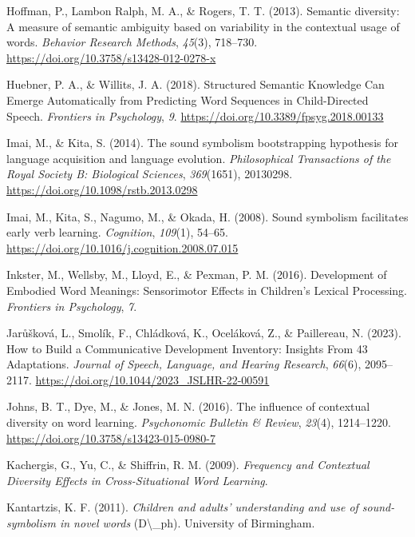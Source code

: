 \documentclass[
  man,floatsintext]{apa6}
\newlength{\cslhangindent}
\newenvironment{CSLReferences}[2] %
 {\begin{list}{}{%
  \setlength{\itemindent}{0pt}
  \setlength{\leftmargin}{0pt}
  \setlength{\parsep}{0pt}
  \ifodd #1
   \setlength{\leftmargin}{\cslhangindent}
   \setlength{\itemindent}{-1\cslhangindent}
  \fi
  \setlength{\itemsep}{#2\baselineskip}}}
 {\end{list}}
\begin{document}
\begin{CSLReferences}{1}{0}
Hoffman, P., Lambon Ralph, M. A., \& Rogers, T. T. (2013). Semantic diversity: {A} measure of semantic ambiguity based on variability in the contextual usage of words. \emph{Behavior Research Methods}, \emph{45}(3), 718--730. \url{https://doi.org/10.3758/s13428-012-0278-x}

Huebner, P. A., \& Willits, J. A. (2018). Structured {Semantic Knowledge Can Emerge Automatically} from {Predicting Word Sequences} in {Child-Directed Speech}. \emph{Frontiers in Psychology}, \emph{9}. \url{https://doi.org/10.3389/fpsyg.2018.00133}

Imai, M., \& Kita, S. (2014). The sound symbolism bootstrapping hypothesis for language acquisition and language evolution. \emph{Philosophical Transactions of the Royal Society B: Biological Sciences}, \emph{369}(1651), 20130298. \url{https://doi.org/10.1098/rstb.2013.0298}

Imai, M., Kita, S., Nagumo, M., \& Okada, H. (2008). Sound symbolism facilitates early verb learning. \emph{Cognition}, \emph{109}(1), 54--65. \url{https://doi.org/10.1016/j.cognition.2008.07.015}

Inkster, M., Wellsby, M., Lloyd, E., \& Pexman, P. M. (2016). Development of {Embodied Word Meanings}: {Sensorimotor Effects} in {Children}'s {Lexical Processing}. \emph{Frontiers in Psychology}, \emph{7}.

Jarůšková, L., Smolík, F., Chládková, K., Oceláková, Z., \& Paillereau, N. (2023). How to {Build} a {Communicative Development Inventory}: {Insights From} 43 {Adaptations}. \emph{Journal of Speech, Language, and Hearing Research}, \emph{66}(6), 2095--2117. \url{https://doi.org/10.1044/2023_JSLHR-22-00591}

Johns, B. T., Dye, M., \& Jones, M. N. (2016). The influence of contextual diversity on word learning. \emph{Psychonomic Bulletin \& Review}, \emph{23}(4), 1214--1220. \url{https://doi.org/10.3758/s13423-015-0980-7}

Kachergis, G., Yu, C., \& Shiffrin, R. M. (2009). \emph{Frequency and {Contextual Diversity Effects} in {Cross-Situational Word Learning}}.

Kantartzis, K. F. (2011). \emph{Children and adults' understanding and use of sound-symbolism in novel words} (D\textbackslash\_ph). University of Birmingham.


\end{CSLReferences}
\end{document}
